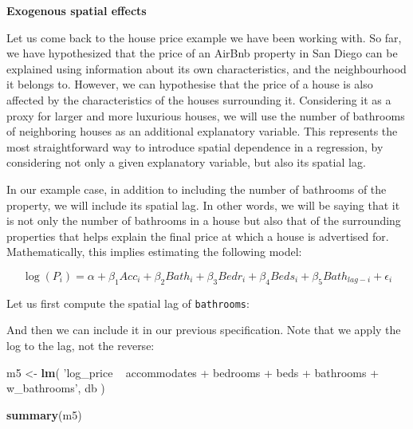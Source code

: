 \documentclass[
]{book}
\newenvironment{Shaded}{\begin{snugshade}}{\end{snugshade}}
\newcommand{\KeywordTok}[1]{\textcolor[rgb]{0.13,0.29,0.53}{\textbf{#1}}}
\newcommand{\NormalTok}[1]{#1}
\newcommand{\OperatorTok}[1]{\textcolor[rgb]{0.81,0.36,0.00}{\textbf{#1}}}
\newcommand{\StringTok}[1]{\textcolor[rgb]{0.31,0.60,0.02}{#1}}
\begin{document}
\textbf{Exogenous spatial effects}

Let us come back to the house price example we have been working with. So far, we have hypothesized that the price of an AirBnb property in San Diego can be explained using information about its own characteristics, and the neighbourhood it belongs to. However, we can hypothesise that the price of a house is also affected by the characteristics of the houses surrounding it. Considering it as a proxy for larger and more luxurious houses, we will use the number of bathrooms of neighboring houses as an additional explanatory variable. This represents the most straightforward way to introduce spatial dependence in a regression, by considering not only a given explanatory variable, but also its spatial lag.

In our example case, in addition to including the number of bathrooms of the property, we will include its spatial lag. In other words, we will be saying that it is not only the number of bathrooms in a house but also that of the surrounding properties that helps explain the final price at which a house is advertised for. Mathematically, this implies estimating the following model:

\[
\log(P_i) = \alpha + \beta_1 Acc_i + \beta_2 Bath_i + \beta_3 Bedr_i + \beta_4 Beds_i+ \beta_5 Bath_{lag-i} + \epsilon_i
\]

Let us first compute the spatial lag of \texttt{bathrooms}:

\begin{Shaded}
\end{Shaded}

And then we can include it in our previous specification. Note that we apply the log to the lag, not the reverse:

\begin{Shaded}
\begin{Highlighting}[]
\NormalTok{m5 <-}\StringTok{ }\KeywordTok{lm}\NormalTok{(}
  \StringTok{'log_price ~ accommodates + bedrooms + beds + bathrooms + w_bathrooms'}\NormalTok{,}
\NormalTok{  db}
\NormalTok{)}

\KeywordTok{summary}\NormalTok{(m5)}
\end{Highlighting}
\end{Shaded}
\end{document}
